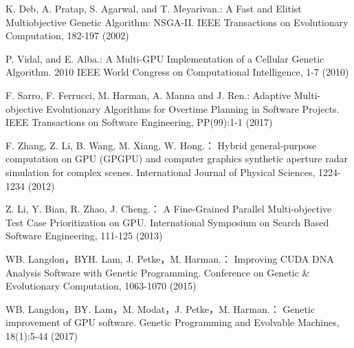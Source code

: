 \begin{thebibliography}{}
K. Deb, A. Pratap, S. Agarwal, and T. Meyarivan.:
A Fast and Elitist Multiobjective Genetic Algorithm: NSGA-II.
IEEE Transactions on Evolutionary Computation, 182-197 (2002)

P. Vidal, and E. Alba.:
A Multi-GPU Implementation of a Cellular Genetic Algorithm.
2010 IEEE World Congress on Computational Intelligence, 1-7 (2010)

F. Sarro, F. Ferrucci, M. Harman, A. Manna and J. Ren.:
Adaptive Multi-objective Evolutionary Algorithms for Overtime Planning in Software Projects.
IEEE Transactions on Software Engineering, PP(99):1-1 (2017)

F. Zhang, Z. Li, B. Wang, M. Xiang, W. Hong.：
Hybrid general-purpose computation on GPU (GPGPU) and computer graphics synthetic aperture radar simulation for complex scenes.
International Journal of Physical Sciences, 1224-1234 (2012)

Z. Li, Y. Bian, R. Zhao, J. Cheng.：
A Fine-Grained Parallel Multi-objective Test Case Prioritization on GPU.
International Symposium on Search Based Software Engineering, 111-125 (2013)

WB. Langdon，BYH. Lam, J. Petke，M. Harman.：
Improving CUDA DNA Analysis Software with Genetic Programming.
Conference on Genetic \& Evolutionary Computation, 1063-1070 (2015)

WB. Langdon，BY. Lam，M. Modat，J. Petke，M. Harman.：
Genetic improvement of GPU software.
Genetic Programming and Evolvable Machines, 18(1):5-44 (2017)











\end{thebibliography}
\clearpage

